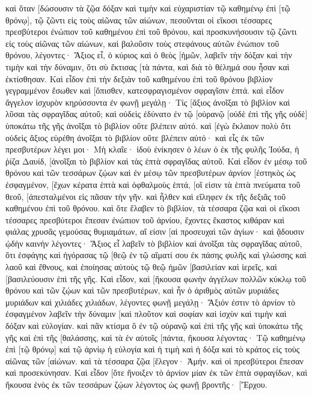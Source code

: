 καὶ ὅταν [δώσουσιν τὰ ζῷα δόξαν καὶ τιμὴν καὶ εὐχαριστίαν τῷ καθημένῳ ἐπὶ [τῷ θρόνῳ], τῷ ζῶντι εἰς τοὺς αἰῶνας τῶν αἰώνων, 
πεσοῦνται οἱ εἴκοσι τέσσαρες πρεσβύτεροι ἐνώπιον τοῦ καθημένου ἐπὶ τοῦ θρόνου, καὶ προσκυνήσουσιν τῷ ζῶντι εἰς τοὺς αἰῶνας τῶν αἰώνων, καὶ βαλοῦσιν τοὺς στεφάνους αὐτῶν ἐνώπιον τοῦ θρόνου, λέγοντες· 
Ἄξιος εἶ, ὁ κύριος καὶ ὁ θεὸς [ἡμῶν, λαβεῖν τὴν δόξαν καὶ τὴν τιμὴν καὶ τὴν δύναμιν, ὅτι σὺ ἔκτισας [τὰ πάντα, καὶ διὰ τὸ θέλημά σου ἦσαν καὶ ἐκτίσθησαν. 
Καὶ εἶδον ἐπὶ τὴν δεξιὰν τοῦ καθημένου ἐπὶ τοῦ θρόνου βιβλίον γεγραμμένον ἔσωθεν καὶ [ὄπισθεν, κατεσφραγισμένον σφραγῖσιν ἑπτά. 
καὶ εἶδον ἄγγελον ἰσχυρὸν κηρύσσοντα ἐν φωνῇ μεγάλῃ· Τίς [ἄξιος ἀνοῖξαι τὸ βιβλίον καὶ λῦσαι τὰς σφραγῖδας αὐτοῦ; 
καὶ οὐδεὶς ἐδύνατο ἐν τῷ [οὐρανῷ [οὐδὲ ἐπὶ τῆς γῆς οὐδὲ] ὑποκάτω τῆς γῆς ἀνοῖξαι τὸ βιβλίον οὔτε βλέπειν αὐτό. 
καὶ [ἐγὼ ἔκλαιον πολὺ ὅτι οὐδεὶς ἄξιος εὑρέθη ἀνοῖξαι τὸ βιβλίον οὔτε βλέπειν αὐτό· 
καὶ εἷς ἐκ τῶν πρεσβυτέρων λέγει μοι· Μὴ κλαῖε· ἰδοὺ ἐνίκησεν ὁ λέων ὁ ἐκ τῆς φυλῆς Ἰούδα, ἡ ῥίζα Δαυίδ, [ἀνοῖξαι τὸ βιβλίον καὶ τὰς ἑπτὰ σφραγῖδας αὐτοῦ. 
Καὶ εἶδον ἐν μέσῳ τοῦ θρόνου καὶ τῶν τεσσάρων ζῴων καὶ ἐν μέσῳ τῶν πρεσβυτέρων ἀρνίον [ἑστηκὸς ὡς ἐσφαγμένον, [ἔχων κέρατα ἑπτὰ καὶ ὀφθαλμοὺς ἑπτά, [οἵ εἰσιν τὰ ἑπτὰ πνεύματα τοῦ θεοῦ, [ἀπεσταλμένοι εἰς πᾶσαν τὴν γῆν. 
καὶ ἦλθεν καὶ εἴληφεν ἐκ τῆς δεξιᾶς τοῦ καθημένου ἐπὶ τοῦ θρόνου. 
καὶ ὅτε ἔλαβεν τὸ βιβλίον, τὰ τέσσαρα ζῷα καὶ οἱ εἴκοσι τέσσαρες πρεσβύτεροι ἔπεσαν ἐνώπιον τοῦ ἀρνίου, ἔχοντες ἕκαστος κιθάραν καὶ φιάλας χρυσᾶς γεμούσας θυμιαμάτων, αἵ εἰσιν [αἱ προσευχαὶ τῶν ἁγίων· 
καὶ ᾄδουσιν ᾠδὴν καινὴν λέγοντες· Ἄξιος εἶ λαβεῖν τὸ βιβλίον καὶ ἀνοῖξαι τὰς σφραγῖδας αὐτοῦ, ὅτι ἐσφάγης καὶ ἠγόρασας τῷ [θεῷ ἐν τῷ αἵματί σου ἐκ πάσης φυλῆς καὶ γλώσσης καὶ λαοῦ καὶ ἔθνους, 
καὶ ἐποίησας αὐτοὺς τῷ θεῷ ἡμῶν [βασιλείαν καὶ ἱερεῖς, καὶ [βασιλεύουσιν ἐπὶ τῆς γῆς. 
Καὶ εἶδον, καὶ [ἤκουσα φωνὴν ἀγγέλων πολλῶν κύκλῳ τοῦ θρόνου καὶ τῶν ζῴων καὶ τῶν πρεσβυτέρων, καὶ ἦν ὁ ἀριθμὸς αὐτῶν μυριάδες μυριάδων καὶ χιλιάδες χιλιάδων, 
λέγοντες φωνῇ μεγάλῃ· Ἄξιόν ἐστιν τὸ ἀρνίον τὸ ἐσφαγμένον λαβεῖν τὴν δύναμιν [καὶ πλοῦτον καὶ σοφίαν καὶ ἰσχὺν καὶ τιμὴν καὶ δόξαν καὶ εὐλογίαν. 
καὶ πᾶν κτίσμα ὃ ἐν τῷ οὐρανῷ καὶ ἐπὶ τῆς γῆς καὶ ὑποκάτω τῆς γῆς καὶ ἐπὶ τῆς [θαλάσσης, καὶ τὰ ἐν αὐτοῖς [πάντα, ἤκουσα λέγοντας· Τῷ καθημένῳ ἐπὶ [τῷ θρόνῳ] καὶ τῷ ἀρνίῳ ἡ εὐλογία καὶ ἡ τιμὴ καὶ ἡ δόξα καὶ τὸ κράτος εἰς τοὺς αἰῶνας τῶν [αἰώνων. 
καὶ τὰ τέσσαρα ζῷα [ἔλεγον· Ἀμήν. καὶ οἱ πρεσβύτεροι ἔπεσαν καὶ προσεκύνησαν. 
Καὶ εἶδον [ὅτε ἤνοιξεν τὸ ἀρνίον μίαν ἐκ τῶν ἑπτὰ σφραγίδων, καὶ ἤκουσα ἑνὸς ἐκ τῶν τεσσάρων ζῴων λέγοντος ὡς φωνῇ βροντῆς· [Ἔρχου. 
